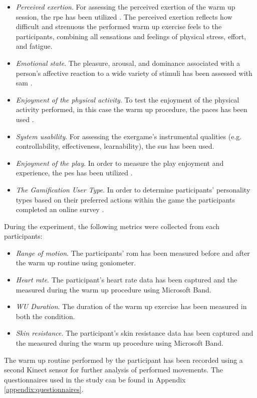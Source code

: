 \begin{itemize}
\item \textit{Perceived exertion}. For assessing the perceived exertion of the warm up session, the \gls{rpe} has been utilized \cite{borg1998borg}. The perceived exertion reflects how difficult and strenuous the performed warm up exercise feels to the participants, combining all sensations and feelings of physical stress, effort, and fatigue.
\item \textit{Emotional state}. The pleasure, arousal, and dominance associated with a person's affective reaction to a wide variety of stimuli has been assessed with \gls{sam} \cite{bradley1994measuring}. 
\item \textit{Enjoyment of the physical activity}. To test the enjoyment of the physical activity performed, in this case the warm up procedure, the \gls{paces} has been used \cite{kendzierski1991physical}. 
\item \textit{System usability}. For assessing the exergame's instrumental qualities (e.g. controllability, effectiveness, learnability), the \gls{sus} has been used.
\item \textit{Enjoyment of the play}. In order to measure the play enjoyment and experience, the \gls{pes} has been utilized  \cite{pavlas2012play}.
\item \textit{The Gamification User Type}. In order to determine participants’ personality types based on their preferred actions within the game \cite{tondello2016gamification} the participants completed an online survey \cite{userTypeTest}.
\end{itemize}
During the experiment, the following metrics were collected from each participants:
\begin{itemize}
\item \textit{Range of motion}. The participants' \acrshort{rom} has been measured before and after the warm up routine using goniometer.
\item \textit{Heart rate}. The participant's heart rate data has been captured and the measured during the warm up procedure using Microsoft Band.
\item \textit{WU Duration}.  The duration of the warm up exercise has been measured in both the condition.
\item \textit{Skin resistance}. The participant's skin resistance data has been captured and the measured during the warm up procedure using Microsoft Band.
\end{itemize}
The warm up routine performed by the participant has been recorded using a second Kinect sensor for further analysis of performed movements. The questionnaires used in the study can be found in Appendix \ref{appendix:questionnaires}.
